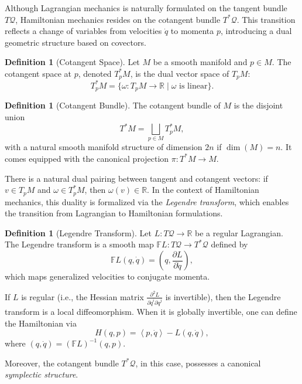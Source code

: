 \documentclass{article}
\theoremstyle{plain}
\theoremstyle{definition}
\newtheorem{definition}[theorem]{Definition}
\theoremstyle{remark}
\begin{document}
Although Lagrangian mechanics is naturally formulated on the tangent bundle $T\mathcal{Q}$, Hamiltonian mechanics resides on the cotangent bundle $T^*\mathcal{Q}$. This transition reflects a change of variables from velocities $\dot{q}$ to momenta $p$, introducing a dual geometric structure based on covectors.

\begin{definition}[Cotangent Space]
Let $M$ be a smooth manifold and $p \in M$. The cotangent space at $p$, denoted $T_p^* M$, is the dual vector space of $T_p M$:
\begin{equation}
    T_p^* M = \{\omega: T_p M \to \mathbb{R} \mid \omega \text{ is linear} \}.
\end{equation}

\end{definition}

\begin{definition}[Cotangent Bundle]
The cotangent bundle of $M$ is the disjoint union
\[
T^* M = \bigsqcup_{p \in M} T_p^* M,
\]
with a natural smooth manifold structure of dimension $2n$ if $\dim(M) = n$. It comes equipped with the canonical projection $\pi: T^*M \to M$.
\end{definition}


There is a natural dual pairing between tangent and cotangent vectors: if $v \in T_p M$ and $\omega \in T_p^* M$, then $\omega(v) \in \mathbb{R}$. In the context of Hamiltonian mechanics, this duality is formalized via the \emph{Legendre transform}, which enables the transition from Lagrangian to Hamiltonian formulations.


\begin{definition}[Legendre Transform]
Let $L: T\mathcal{Q} \to \mathbb{R}$ be a regular Lagrangian. The Legendre transform is a smooth map $\mathbb{F}L: T\mathcal{Q} \to T^*\mathcal{Q}$ defined by
\[
\mathbb{F}L(q, \dot{q}) = \left(q, \frac{\partial L}{\partial \dot{q}}\right),
\]
which maps generalized velocities to conjugate momenta.
\end{definition}

If $L$ is regular (i.e., the Hessian matrix $\frac{\partial^2 L}{\partial \dot{q}^i \partial \dot{q}^j}$ is invertible), then the Legendre transform is a local diffeomorphism. When it is globally invertible, one can define the Hamiltonian via
\[
H(q, p) = \left\langle p, \dot{q} \right\rangle - L(q, \dot{q}),
\]
where $(q, \dot{q}) = (\mathbb{F}L)^{-1}(q, p)$.

Moreover, the cotangent bundle $T^*\mathcal{Q}$, in this case, possesses a canonical \emph{symplectic structure}.
\end{document}
